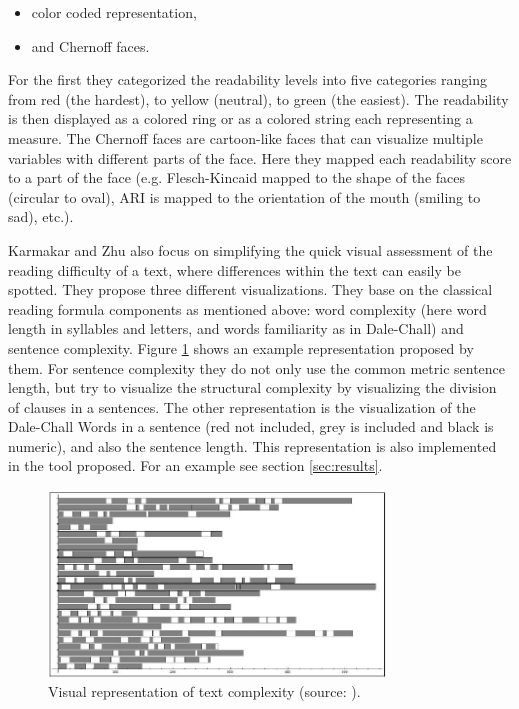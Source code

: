 \documentclass[runningheads,a4paper]{llncs}
\begin{document}
\begin{itemize}
	\item color coded representation,
	\item and Chernoff faces.
\end{itemize}

For the first they categorized the readability levels into five categories ranging from red (the hardest), to yellow (neutral), to green (the easiest). The readability is then displayed as a colored ring or as a colored string each representing a measure.
The Chernoff faces \cite{Chernoff1973} are cartoon-like faces that can visualize multiple variables with different parts of the face. Here they mapped each readability score to a part of the face (e.g. Flesch-Kincaid mapped to the shape of the faces (circular to oval), ARI is mapped to the orientation of the mouth (smiling to sad), etc.).

Karmakar and Zhu \cite{Karmakar2010} also focus on simplifying the quick visual assessment of the reading difficulty of a text, where differences within the text can easily be spotted. They propose three different visualizations. They base on the classical reading formula components as mentioned above: word complexity (here word length in syllables and letters, and words familiarity as in Dale-Chall) and sentence complexity. Figure \ref{fig:chall_chart} shows an example representation proposed by them. For sentence complexity they do not only use the common metric sentence length, but try to visualize the structural complexity by visualizing the division of clauses in a sentences. The other representation is the visualization of the Dale-Chall Words in a sentence (red not included, grey is included and black is numeric), and also the sentence length. This representation is also implemented in the tool proposed. For an example see section \ref{sec:results}.

\begin{figure}
\centering
\includegraphics[width=0.8\textwidth]{Bilder/chall_chart.png}
\caption{Visual representation of text complexity (source: \cite{Karmakar2010}).}
\label{fig:chall_chart}
\end{figure}
\end{document}

